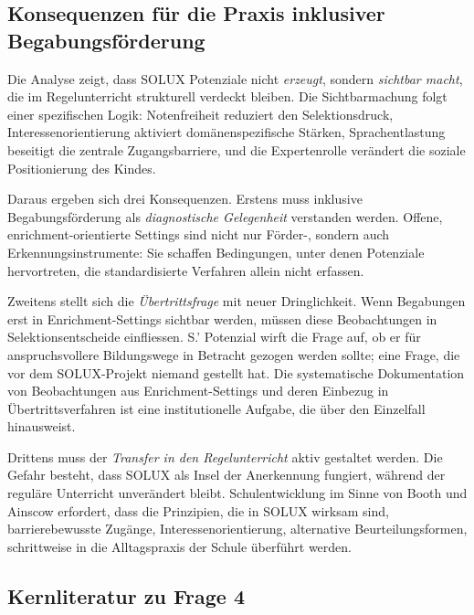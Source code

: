 \documentclass[ngerman, a4paper]{article}
\begin{document}
\subsection{Konsequenzen für die Praxis inklusiver Begabungsförderung}

Die Analyse zeigt, dass SOLUX Potenziale nicht \textit{erzeugt}, sondern
\textit{sichtbar macht}, die im Regelunterricht strukturell verdeckt bleiben. Die
Sichtbarmachung folgt einer spezifischen Logik: Notenfreiheit reduziert den
Selektionsdruck, Interessenorientierung aktiviert domänenspezifische Stärken,
Sprachentlastung beseitigt die zentrale Zugangsbarriere, und die Expertenrolle
verändert die soziale Positionierung des Kindes.

Daraus ergeben sich drei Konsequenzen. Erstens muss inklusive Begabungsförderung
als \textit{diagnostische Gelegenheit} verstanden werden. Offene, enrichment-orientierte
Settings sind nicht nur Förder-, sondern auch Erkennungsinstrumente: Sie schaffen
Bedingungen, unter denen Potenziale hervortreten, die standardisierte Verfahren
allein nicht erfassen.

Zweitens stellt sich die \textit{Übertrittsfrage} mit neuer Dringlichkeit. Wenn
Begabungen erst in Enrichment-Settings sichtbar werden, müssen diese Beobachtungen
in Selektionsentscheide einfliessen. S.' Potenzial wirft die Frage auf, ob er für
anspruchsvollere Bildungswege in Betracht gezogen werden sollte; eine Frage, die vor
dem SOLUX-Projekt niemand gestellt hat. Die systematische Dokumentation von
Beobachtungen aus Enrichment-Settings und deren Einbezug in Übertrittsverfahren ist
eine institutionelle Aufgabe, die über den Einzelfall hinausweist.

Drittens muss der \textit{Transfer in den Regelunterricht} aktiv gestaltet werden.
Die Gefahr besteht, dass SOLUX als Insel der Anerkennung fungiert, während der
reguläre Unterricht unverändert bleibt. Schulentwicklung im Sinne von Booth und
Ainscow erfordert, dass die Prinzipien, die in SOLUX wirksam sind, barrierebewusste
Zugänge, Interessenorientierung, alternative Beurteilungsformen, schrittweise
in die Alltagspraxis der Schule überführt werden.
 
\subsection{Kernliteratur zu Frage 4}
 
\end{document}
